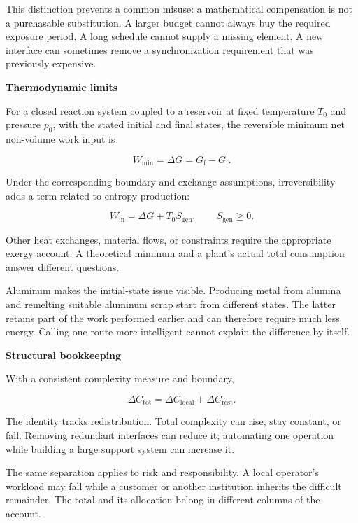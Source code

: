 \documentclass[11pt,openany]{book}
\newcommand{\subhead}[1]{\par\medskip\noindent\textbf{#1}\par\nobreak\smallskip}
\begin{document}
This distinction prevents a common misuse: a mathematical compensation is not a purchasable substitution. A larger budget cannot always buy the required exposure period. A long schedule cannot supply a missing element. A new interface can sometimes remove a synchronization requirement that was previously expensive.

\subhead{Thermodynamic limits}

For a closed reaction system coupled to a reservoir at fixed temperature $T_0$ and pressure $p_0$, with the stated initial and final states, the reversible minimum net non-volume work input is

\begin{equation}
W_{\min}=\Delta G=G_{\mathrm f}-G_{\mathrm i}.
\end{equation}

Under the corresponding boundary and exchange assumptions, irreversibility adds a term related to entropy production:

\begin{equation}
W_{\mathrm{in}}=\Delta G+T_0S_{\mathrm{gen}},
\qquad S_{\mathrm{gen}}\geq0.
\end{equation}

Other heat exchanges, material flows, or constraints require the appropriate exergy account. A theoretical minimum and a plant's actual total consumption answer different questions.

Aluminum makes the initial-state issue visible. Producing metal from alumina and remelting suitable aluminum scrap start from different states. The latter retains part of the work performed earlier and can therefore require much less energy.\cite{quinkertz2001scenario} Calling one route more intelligent cannot explain the difference by itself.

\subhead{Structural bookkeeping}

With a consistent complexity measure and boundary,

\begin{equation}
\Delta C_{\mathrm{tot}}=
\Delta C_{\mathrm{local}}+\Delta C_{\mathrm{rest}}.
\end{equation}

The identity tracks redistribution. Total complexity can rise, stay constant, or fall. Removing redundant interfaces can reduce it; automating one operation while building a large support system can increase it.

The same separation applies to risk and responsibility. A local operator's workload may fall while a customer or another institution inherits the difficult remainder. The total and its allocation belong in different columns of the account.
\end{document}
